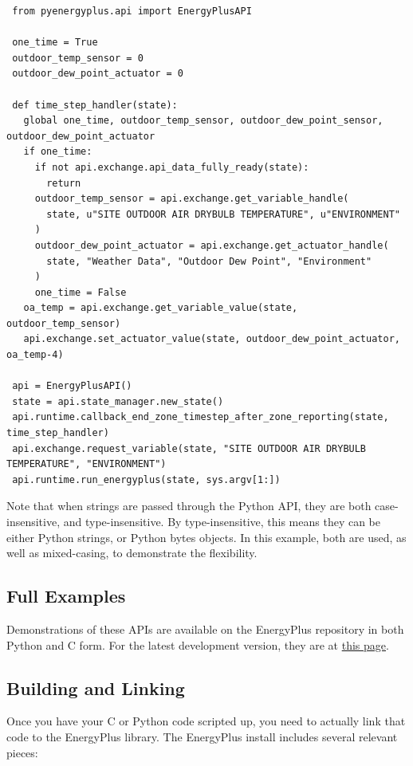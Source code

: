 \begin{lstlisting}
 from pyenergyplus.api import EnergyPlusAPI

 one_time = True
 outdoor_temp_sensor = 0
 outdoor_dew_point_actuator = 0

 def time_step_handler(state):
   global one_time, outdoor_temp_sensor, outdoor_dew_point_sensor, outdoor_dew_point_actuator
   if one_time:
     if not api.exchange.api_data_fully_ready(state):
       return
     outdoor_temp_sensor = api.exchange.get_variable_handle(
       state, u"SITE OUTDOOR AIR DRYBULB TEMPERATURE", u"ENVIRONMENT"
     )
     outdoor_dew_point_actuator = api.exchange.get_actuator_handle(
       state, "Weather Data", "Outdoor Dew Point", "Environment"
     )
     one_time = False
   oa_temp = api.exchange.get_variable_value(state, outdoor_temp_sensor)
   api.exchange.set_actuator_value(state, outdoor_dew_point_actuator, oa_temp-4)

 api = EnergyPlusAPI()
 state = api.state_manager.new_state()
 api.runtime.callback_end_zone_timestep_after_zone_reporting(state, time_step_handler)
 api.exchange.request_variable(state, "SITE OUTDOOR AIR DRYBULB TEMPERATURE", "ENVIRONMENT")
 api.runtime.run_energyplus(state, sys.argv[1:])
\end{lstlisting}

Note that when strings are passed through the Python API, they are both case-insensitive, and type-insensitive.
By type-insensitive, this means they can be either Python strings, or Python bytes objects.
In this example, both are used, as well as mixed-casing, to demonstrate the flexibility.

\subsection{Full Examples}\label{subsec:full-examples}

Demonstrations of these APIs are available on the EnergyPlus repository in both Python and C form.
For the latest development version, they are at \href{https://github.com/NatLabRockies/EnergyPlus/tree/develop/tst/EnergyPlus/api}{this page}.

\subsection{Building and Linking}\label{subsec:building-and-linking}

Once you have your C or Python code scripted up, you need to actually link that code to the EnergyPlus library.
The EnergyPlus install includes several relevant pieces:

